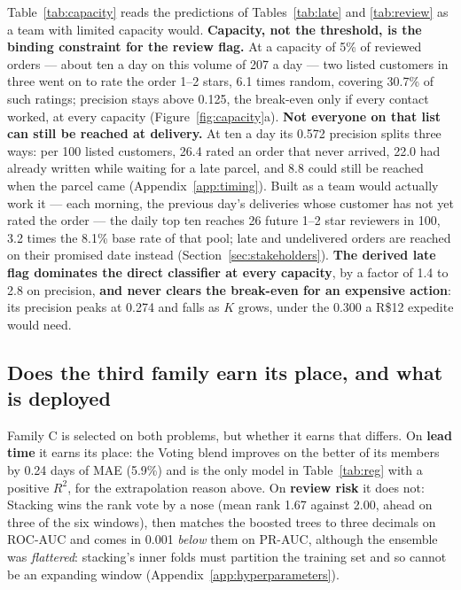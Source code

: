 Table~\ref{tab:capacity} reads the predictions of Tables~\ref{tab:late} and
\ref{tab:review} as a team with limited capacity would. \textbf{Capacity, not
the threshold, is the binding constraint for the review flag.} At a capacity of 5\% of reviewed orders --- about ten a day on this
volume of 207 a day --- two listed customers in three went on to rate the order
1--2 stars, 6.1 times random, covering 30.7\% of such ratings; precision stays
above 0.125, the break-even only if every contact worked, at every capacity
(Figure~\ref{fig:capacity}a).
\textbf{Not everyone on that list can still be reached at delivery.} At ten a day
its 0.572 precision splits three ways: per 100 listed customers, 26.4 rated an
order that never arrived, 22.0 had already written while waiting for a late
parcel, and 8.8 could still be reached when the parcel came
(Appendix~\ref{app:timing}). Built as a team would actually work it --- each
morning, the previous day's deliveries whose customer has not yet rated the
order --- the daily top ten reaches 26 future 1--2 star reviewers in 100, 3.2
times the 8.1\% base rate of that pool; late and undelivered orders are reached
on their promised date instead (Section~\ref{sec:stakeholders}). \textbf{The
derived late flag dominates the direct classifier at every capacity}, by a factor
of 1.4 to 2.8 on precision, \textbf{and never clears the break-even for
an expensive action}: its precision peaks at 0.274 and falls as $K$ grows, under
the 0.300 a R\$12 expedite would need.

\subsection{Does the third family earn its place, and what is deployed}
\label{sec:results-ensemble}

Family C is selected on both problems, but whether it earns that differs. On
\textbf{lead time} it earns its place: the Voting blend improves on the better of
its members by 0.24 days of MAE (5.9\%) and is the only model in
Table~\ref{tab:reg} with a positive $R^2$, for the extrapolation reason above. On
\textbf{review risk} it does not: Stacking wins the rank vote by a nose (mean
rank 1.67 against 2.00, ahead on three of the six windows), then matches the
boosted trees to three decimals on ROC-AUC and comes in 0.001 \emph{below} them
on PR-AUC, although the ensemble was \emph{flattered}: stacking's inner folds
must partition the training set and so cannot be an expanding window
(Appendix~\ref{app:hyperparameters}).

